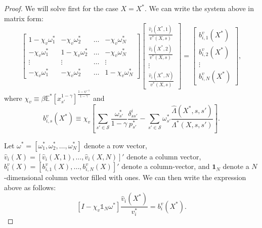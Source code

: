\begin{proof}
We will solve first for the case $X = X^*$. We can write the system above in matrix form:
\begin{equation}
    \left[
    \begin{matrix}
    1 - \chi_v \omega_{1}^* &
    - \chi_v \omega_{2}^* & \ldots &
    - \chi_v \omega_{N}^* \\
     - \chi_v \omega_{1}^* &
    1- \chi_v \omega_{2}^* & \ldots & 
    - \chi_v \omega_{N}^* \\
    \vdots & \vdots & \ldots & \vdots \\
    - \chi_v \omega_{1}^* &
    - \chi_v \omega_{2}^* & \ldots &
    1- \chi_v \omega_{N}^* 
    \end{matrix}
    \right]
    \left[\begin{matrix}
    \frac{\hat{v}_i(X^*,1)}{v^*(X,s)}\\
    \frac{\hat{v}_i(X^*,2)}{v^*(X,s)}\\
    \vdots\\
    \frac{\hat{v}_i(X^*,N)}{v^*(X,s)}
    \end{matrix}
    \right]
    = \left[\begin{matrix}
    b_{i,1}^v(X^*)\\
    b_{i,2}^v(X^*)\\
    \vdots\\
    b_{i,N}^v(X^*)
    \end{matrix}
    \right],
\end{equation}
where $\chi_v \equiv \beta \mathbb{E}^*[x_{s'}^{1-\gamma}]^{\frac{1-\psi^{-1}}{1-\gamma}}$ and
\begin{equation}
    b_{i,s}^v(X^*) \equiv \chi_v \left[ \sum_{s'\in \mathcal{S}}\frac{ \omega^*_{s'}}{1-\gamma} \frac{\delta_{ss'}^i}{p_{s'}^*} -\sum_{s'\in \mathcal{S}} \omega_{s'}^* \frac{\hat{\Lambda}(X^*,s,s')}{\Lambda^*(X,s,s')}  \right].
\end{equation}

Let $\omega^* = \left[ \omega_1^*,\omega_2^*,\ldots, \omega_N^*\right]$ denote a row vector, $\hat{v}_i(X) = \left[ \hat{v}_i(X, 1), \ldots, \hat{v}_i(X, N)\right]'$ denote a column vector, $b_i^v(X) = \left[ b_{i,1}^v(X), \ldots, b_{i,N}^v(X) \right]' $ denote a column-vector, and $\textbf{1}_N$ denote a $N$-dimensional column vector filled with ones. We can then write the expression above as follows:
\begin{equation}
    \left[ I- \chi_v \mathbb{1}_N\omega^* \right] \frac{\hat{v}_i(X^*)}{v_i^*} = b_{i}^v(X^*).
\end{equation}


\end{proof}
